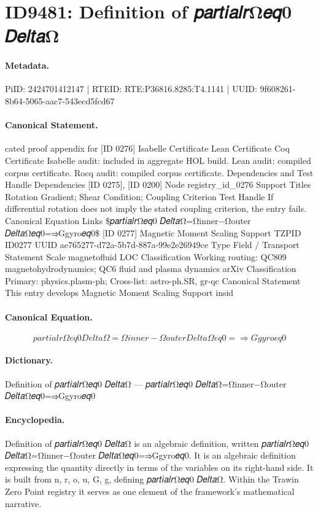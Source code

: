 \section*{ID9481: Definition of 𝑝𝑎𝑟𝑡𝑖𝑎𝑙𝑟Ω𝑒𝑞0 𝐷𝑒𝑙𝑡𝑎Ω}
\paragraph{Metadata.}
PiID: 2424701412147 | RTEID: RTE:P36816.8285:T4.1141 | UUID: 9f608261-8b64-5065-aac7-543ecd5fcd67

\paragraph{Canonical Statement.}
cated proof appendix for [ID 0276] Isabelle Certificate Lean Certificate Coq Certificate Isabelle audit: included in aggregate HOL build. Lean audit: compiled corpus certificate. Rocq audit: compiled corpus certificate. Dependencies and Test Handle Dependencies [ID 0275], [ID 0200] Node registry\_id\_0276 Support Titles Rotation Gradient; Shear Condition; Coupling Criterion Test Handle If differential rotation does not imply the stated coupling criterion, the entry fails. Canonical Equation Links \$𝑝𝑎𝑟𝑡𝑖𝑎𝑙𝑟Ω𝑒𝑞0 𝐷𝑒𝑙𝑡𝑎Ω=Ωinner−Ωouter 𝐷𝑒𝑙𝑡𝑎Ω𝑒𝑞0=⇒Ggyro𝑒𝑞0\$ [ID 0277] Magnetic Moment Scaling Support TZPID ID0277 UUID ae765277-d72a-5b7d-887a-99e2e26949ce Type Field / Transport Statement Scale magnetofluid LOC Classification Working routing: QC809 magnetohydrodynamics; QC6 fluid and plasma dynamics arXiv Classification Primary: physics.plasm-ph; Cross-list: astro-ph.SR, gr-qc Canonical Statement This entry develops Magnetic Moment Scaling Support insid

\paragraph{Canonical Equation.}
\[
𝑝𝑎𝑟𝑡𝑖𝑎𝑙𝑟Ω𝑒𝑞0 𝐷𝑒𝑙𝑡𝑎Ω=Ωinner−Ωouter 𝐷𝑒𝑙𝑡𝑎Ω𝑒𝑞0=⇒Ggyro𝑒𝑞0
\]

\paragraph{Dictionary.}
Definition of 𝑝𝑎𝑟𝑡𝑖𝑎𝑙𝑟Ω𝑒𝑞0 𝐷𝑒𝑙𝑡𝑎Ω — 𝑝𝑎𝑟𝑡𝑖𝑎𝑙𝑟Ω𝑒𝑞0 𝐷𝑒𝑙𝑡𝑎Ω=Ωinner−Ωouter 𝐷𝑒𝑙𝑡𝑎Ω𝑒𝑞0=⇒Ggyro𝑒𝑞0

\paragraph{Encyclopedia.}
Definition of 𝑝𝑎𝑟𝑡𝑖𝑎𝑙𝑟Ω𝑒𝑞0 𝐷𝑒𝑙𝑡𝑎Ω is an algebraic definition, written 𝑝𝑎𝑟𝑡𝑖𝑎𝑙𝑟Ω𝑒𝑞0 𝐷𝑒𝑙𝑡𝑎Ω=Ωinner−Ωouter 𝐷𝑒𝑙𝑡𝑎Ω𝑒𝑞0=⇒Ggyro𝑒𝑞0. It is an algebraic definition expressing the quantity directly in terms of the variables on its right-hand side. It is built from n, r, o, u, G, g, defining 𝑝𝑎𝑟𝑡𝑖𝑎𝑙𝑟Ω𝑒𝑞0 𝐷𝑒𝑙𝑡𝑎Ω. Within the Trawin Zero Point registry it serves as one element of the framework's mathematical narrative.
